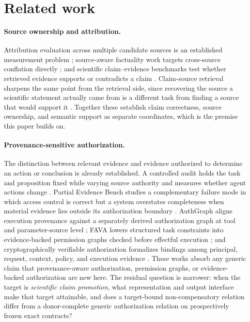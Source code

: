 \section{Related work}
\label{sec:related}

\paragraph{Source ownership and attribution.}
Attribution evaluation across multiple candidate sources is an established measurement problem \citep{attributionbench2024}; source-aware factuality work targets cross-source conflation directly \citep{provenanceguard2026}; and scientific claim--evidence benchmarks test whether retrieved evidence supports or contradicts a claim \citep{claimbench2025}. Claim-source retrieval sharpens the same point from the retrieval side, since recovering the source a scientific statement actually came from is a different task from finding a source that would support it \citep{claimsource2026}. Together these establish claim correctness, source ownership, and semantic support as separate coordinates, which is the premise this paper builds on.

\paragraph{Provenance-sensitive authorization.}
The distinction between relevant evidence and evidence authorized to determine an action or conclusion is already established. A controlled audit holds the task and proposition fixed while varying source authority and measures whether agent actions change \citep{provsen2026}. Partial Evidence Bench studies a complementary failure mode in which access control is correct but a system overstates completeness when material evidence lies outside its authorization boundary \citep{partial2026}. AuthGraph aligns execution provenance against a separately derived authorization graph at tool and parameter-source level \citep{authgraph2026}; FAVA lowers structured task constraints into evidence-backed permission graphs checked before effectful execution \citep{fava2026}; and cryptographically verifiable authorization formalizes bindings among principal, request, context, policy, and execution evidence \citep{cva2026}. These works absorb any generic claim that provenance-aware authorization, permission graphs, or evidence-backed authorization are new here. The residual question is narrower: when the target is \emph{scientific claim promotion}, what representation and output interface make that target attainable, and does a target-bound non-compensatory relation differ from a donor-complete generic authorization relation on prospectively frozen exact contracts?

